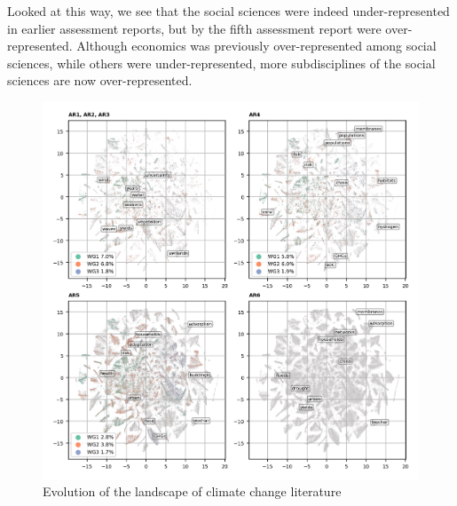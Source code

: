 \documentclass{article}
\begin{document}
\begin{linenumbers}
Looked at this way, we see that the social sciences were indeed under-represented in earlier assessment reports, but by the fifth assessment report were over-represented. Although economics was previously over-represented among social sciences, while others were under-represented, more subdisciplines of the social sciences are now over-represented.


\begin{figure}
	\begin{center}
		\includegraphics[width=180mm]{tsne_results/plots/run_1861_s_0_p100_evolution_4.png}
		\caption{Evolution of the landscape of climate change literature}
		\label{oecd_topic_map}
	\end{center}
\end{figure}





\end{linenumbers}
\end{document}

